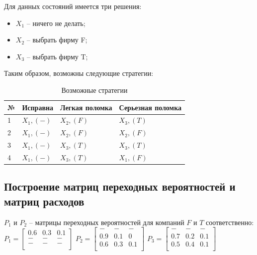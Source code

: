 Для данных состояний имеется три решения:

\begin{itemize}
	\item $X_1$ -- ничего не делать;
	\item $X_2$ -- выбрать фирму F;
	\item $X_3$ -- выбрать фирму T;
\end{itemize}

Таким образом, возможны следующие стратегии:

\begin{table}[h!]
	\centering
	\bgroup
	\captionsetup{singlelinecheck = false, format= hang, justification=raggedleft, font=footnotesize, labelsep=space}
	\caption{Возможные стратегии}
	\def\arraystretch{1}
	\begin{tabular}{ | m{0.3cm} | m{2.2cm} | m{2.8cm} | m{3.1cm} | }
		\hline
		№ & Исправна & Легкая поломка & Серьезная поломка \\ \hline
		1 & $X_1, (-)$ & $X_2, (F)$ & $X_3, (T)$ \\ \hline
		2 & $X_1, (-)$ & $X_2, (F)$ & $X_2, (F)$ \\ \hline
		3 & $X_1, (-)$ & $X_3, (T)$ & $X_3, (T)$ \\ \hline
		4 & $X_1, (-)$ & $X_3, (T)$ & $X_1, (F)$ \\
		\hline
	\end{tabular}
	\egroup
\end{table}

\subsection{Построение матриц переходных вероятностей и матриц расходов}

$P_1$ и $P_2$ -- матрицы переходных вероятностей для компаний $F$ и $T$ соответственно:
\\

$
P_1=\begin{bmatrix}
0.6 & 0.3 & 0.1 \\
- & - & - \\
- & - & - \\
\end{bmatrix}
$
$
P_2=\begin{bmatrix}
- & - & - \\
0.9 & 0.1 & 0 \\
0.6 & 0.3 & 0.1 \\
\end{bmatrix}
$
$
P_3=\begin{bmatrix}
- & - & - \\
0.7 & 0.2 & 0.1 \\
0.5 & 0.4 & 0.1 \\
\end{bmatrix}
$\\


